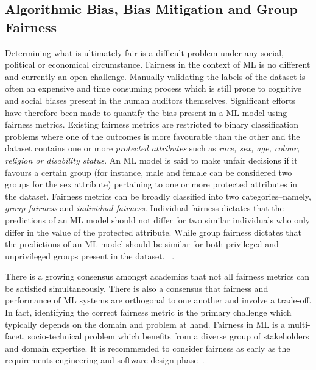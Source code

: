 \documentclass{article}
\begin{document}
\subsection{Algorithmic Bias, Bias Mitigation and Group Fairness}\label{sec:bias-fairness}

Determining what is ultimately fair is a difficult problem under any
social, political or economical circumstance. Fairness in the context
of ML is no different and currently an open challenge. Manually
validating the labels of the dataset is often an expensive and time
consuming process which is still prone to cognitive and social biases
present in the human auditors themselves. Significant efforts have
therefore been made to quantify the bias present in a ML model using
fairness metrics. Existing fairness metrics are restricted to binary
classification problems where one of the outcomes is more favourable
than the other and the dataset contains one or more \emph{protected
attributes} such as \emph{race, sex, age, colour, religion or
disability status}. An ML model is said to make unfair decisions if it
favours a certain group (for instance, male and female can be
considered two groups for the sex attribute) pertaining to one or more
protected attributes in the dataset. Fairness metrics can be broadly
classified into two categories--namely, \emph{group fairness} and
\emph{individual fairness}. Individual fairness dictates that the
predictions of an ML model should not differ for two similar
individuals who only differ in the value of the protected
attribute. While group fairness dictates that the predictions of an ML
model should be similar for both privileged and unprivileged groups
present in the
dataset.  \cite{castelnovo2022clarification,hellman2020measuring,mitchell2021algorithmic,kusner2017counterfactual,grgic2016case,dwork2012fairness,barocas2019fairness,barocas2016big,hardt2016equality,binns2018fairness,hutchinson201950,verma2018fairness,saxena2019fairness}.

There is a growing consensus amongst academics that not all fairness
metrics can be satisfied simultaneously. There is also a consensus
that fairness and performance of ML systems are orthogonal to one
another and involve a trade-off. In fact, identifying the correct
fairness metric is the primary challenge which typically depends on
the domain and problem at hand. Fairness in ML is a multi-facet,
socio-technical problem which benefits from a diverse group of
stakeholders and domain expertise. It is recommended to consider
fairness as early as the requirements engineering and software design
phase \cite{zhang2020machine,chen2022fairness,mehrabi2021survey,zhang2021ignorance}.
\end{document}
